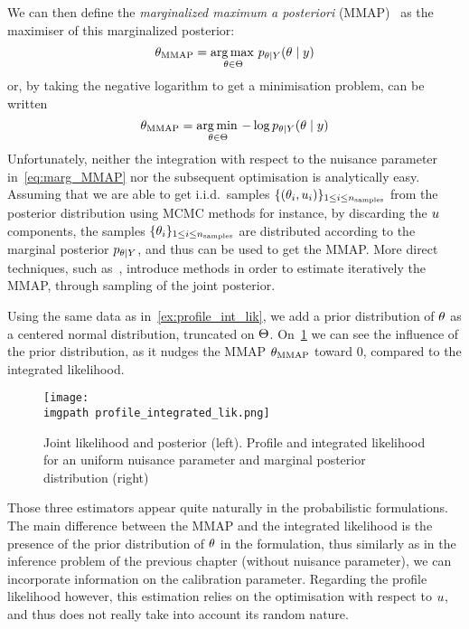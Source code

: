 \documentclass[../../Main_ManuscritThese.tex]{subfiles}
\newcommand\imgpath{/home/victor/acadwriting/Manuscrit/Text/Chapter3/img/}
\begin{document}
We can then define the \emph{marginalized maximum a posteriori} (MMAP)~\citep{doucet_marginal_2002} as the  maximiser of this marginalized posterior:
\begin{equation}
  \label{eq:def_MMAP}
  {\theta}_{\mathrm{MMAP}} = \operatorname*{arg\,max \,}_{\theta\in\Theta} p_{\theta \mid Y}(\theta\mid y)
\end{equation}
or, by taking the negative logarithm to get a minimisation problem, can be written
\begin{equation}
{\theta}_{\mathrm{MMAP}} = \operatorname*{arg\,min \,}_{\theta\in\Theta} -\log  p_{\theta\mid Y}(\theta\mid y)
\end{equation}
Unfortunately, neither the integration with respect to the nuisance parameter in~\eqref{eq:marg_MMAP} nor the subsequent optimisation is analytically easy.
Assuming that we are able to get i.i.d.\ samples $\{(\theta_i, u_i)\}_{1\leq i \leq n_{\mathrm{samples}}}$ from the posterior distribution using MCMC methods for instance, by discarding the $u$ components, the samples $\{\theta_i\}_{1 \leq i\leq n_{\mathrm{samples}}}$ are distributed according to the marginal posterior $p_{\theta \mid Y}$, and thus can be used to get the MMAP. More direct techniques, such as~\cite{doucet_marginal_2002}, introduce methods in order to estimate iteratively the MMAP, through sampling of the joint posterior.
\begin{example}
  Using the same data as in~\cref{ex:profile_int_lik}, we add a prior distribution of $\theta$ as a centered normal distribution, truncated on $\Theta$. On~\cref{fig:profile_integrated_lik} we can see the influence of the prior distribution, as it nudges the MMAP ${\theta}_{\mathrm{MMAP}}$ toward $0$, compared to the integrated likelihood.
\end{example}
\begin{figure}[ht]
  \centering
  \texttt{[image: \\imgpath profile\_integrated\_lik.png]}
  \caption[Joint likelihood and posterior distribution]{\label{fig:profile_integrated_lik} Joint likelihood and posterior (left). Profile and integrated likelihood for an uniform nuisance parameter and marginal posterior distribution (right)}
\end{figure}
Those three estimators appear quite naturally in the probabilistic
formulations. The main difference between the MMAP and the integrated
likelihood is the presence of the prior distribution of $\theta$ in the
formulation, thus similarly as in the inference problem of the
previous chapter (without nuisance parameter), we can incorporate
information on the calibration parameter. Regarding the profile
likelihood however, this estimation relies on the optimisation with
respect to $u$, and thus does not really take into account its
random nature.
\end{document}
